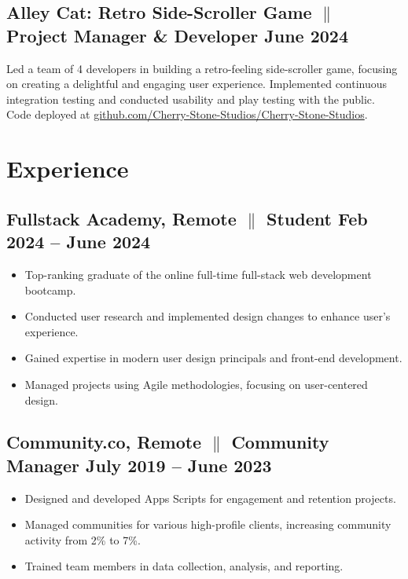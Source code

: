 \documentclass[a4paper,10pt]{article}
\begin{document}
\subsection{Alley Cat: Retro Side-Scroller Game {$\parallel$}{
                  Project Manager
                  \& Developer}
      \hfill \textbf{June 2024}
}
{Led a team of 4 developers in building a retro-feeling side-scroller game,
      focusing on creating a delightful and engaging user experience. Implemented
      continuous integration testing and conducted usability and play testing with
      the public. Code deployed at
      \href{https://github.com/Cherry-Stone-Studios/Cherry-Stone-Studios}{github.com/Cherry-Stone-Studios/Cherry-Stone-Studios}.}

\section{Experience}

\subsection{Fullstack Academy, Remote {$\parallel$}{ Student} \hfill
      \textbf{Feb
            2024 – June
            2024}}
\begin{itemize}
      \item Top-ranking graduate of the online full-time full-stack web
            development bootcamp.
      \item Conducted user research and implemented design changes to enhance
            user's experience.
      \item Gained expertise in modern user design principals and front-end
            development.
      \item Managed projects using Agile methodologies, focusing on
            user-centered design.
\end{itemize}

\subsection{Community.co, Remote {$\parallel$}{ Community Manager} \hfill
      \textbf{July 2019 – June
            2023}}
\begin{itemize}
      \item Designed and developed Apps Scripts for engagement and retention
            projects.
      \item Managed communities for various high-profile clients, increasing
            community activity from 2\% to 7\%.
      \item Trained team members in data collection, analysis, and reporting.
\end{itemize}
\end{document}
